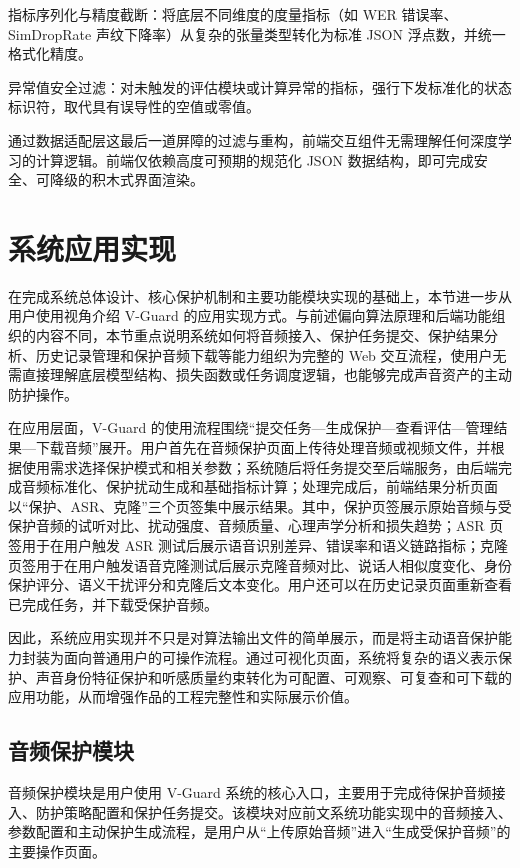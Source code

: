 指标序列化与精度截断：将底层不同维度的度量指标（如 WER
错误率、SimDropRate 声纹下降率）从复杂的张量类型转化为标准 JSON
浮点数，并统一格式化精度。

异常值安全过滤：对未触发的评估模块或计算异常的指标，强行下发标准化的状态标识符，取代具有误导性的空值或零值。

通过数据适配层这最后一道屏障的过滤与重构，前端交互组件无需理解任何深度学习的计算逻辑。前端仅依赖高度可预期的规范化
JSON 数据结构，即可完成安全、可降级的积木式界面渲染。

\section{系统应用实现}\label{ux7cfbux7edfux5e94ux7528ux5b9eux73b0}

在完成系统总体设计、核心保护机制和主要功能模块实现的基础上，本节进一步从用户使用视角介绍
V-Guard
的应用实现方式。与前述偏向算法原理和后端功能组织的内容不同，本节重点说明系统如何将音频接入、保护任务提交、保护结果分析、历史记录管理和保护音频下载等能力组织为完整的
Web
交互流程，使用户无需直接理解底层模型结构、损失函数或任务调度逻辑，也能够完成声音资产的主动防护操作。

在应用层面，V-Guard
的使用流程围绕``提交任务---生成保护---查看评估---管理结果---下载音频''展开。用户首先在音频保护页面上传待处理音频或视频文件，并根据使用需求选择保护模式和相关参数；系统随后将任务提交至后端服务，由后端完成音频标准化、保护扰动生成和基础指标计算；处理完成后，前端结果分析页面以``保护、ASR、克隆''三个页签集中展示结果。其中，保护页签展示原始音频与受保护音频的试听对比、扰动强度、音频质量、心理声学分析和损失趋势；ASR
页签用于在用户触发 ASR
测试后展示语音识别差异、错误率和语义链路指标；克隆页签用于在用户触发语音克隆测试后展示克隆音频对比、说话人相似度变化、身份保护评分、语义干扰评分和克隆后文本变化。用户还可以在历史记录页面重新查看已完成任务，并下载受保护音频。

因此，系统应用实现并不只是对算法输出文件的简单展示，而是将主动语音保护能力封装为面向普通用户的可操作流程。通过可视化页面，系统将复杂的语义表示保护、声音身份特征保护和听感质量约束转化为可配置、可观察、可复查和可下载的应用功能，从而增强作品的工程完整性和实际展示价值。

\subsection{音频保护模块}\label{ux97f3ux9891ux4fddux62a4ux6a21ux5757}

音频保护模块是用户使用 V-Guard
系统的核心入口，主要用于完成待保护音频接入、防护策略配置和保护任务提交。该模块对应前文系统功能实现中的音频接入、参数配置和主动保护生成流程，是用户从``上传原始音频''进入``生成受保护音频''的主要操作页面。

